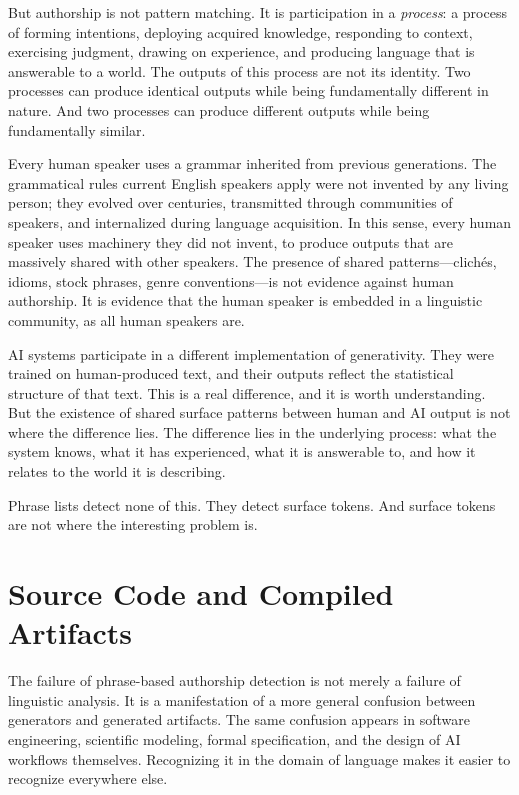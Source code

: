 \documentclass[12pt]{article}
\begin{document}
But authorship is not pattern matching. It is participation in a \emph{process}: a process of forming intentions, deploying acquired knowledge, responding to context, exercising judgment, drawing on experience, and producing language that is answerable to a world. The outputs of this process are not its identity. Two processes can produce identical outputs while being fundamentally different in nature. And two processes can produce different outputs while being fundamentally similar.

Every human speaker uses a grammar inherited from previous generations. The grammatical rules current English speakers apply were not invented by any living person; they evolved over centuries, transmitted through communities of speakers, and internalized during language acquisition. In this sense, every human speaker uses machinery they did not invent, to produce outputs that are massively shared with other speakers. The presence of shared patterns---clich\'es, idioms, stock phrases, genre conventions---is not evidence against human authorship. It is evidence that the human speaker is embedded in a linguistic community, as all human speakers are.

AI systems participate in a different implementation of generativity. They were trained on human-produced text, and their outputs reflect the statistical structure of that text. This is a real difference, and it is worth understanding. But the existence of shared surface patterns between human and AI output is not where the difference lies. The difference lies in the underlying process: what the system knows, what it has experienced, what it is answerable to, and how it relates to the world it is describing.

Phrase lists detect none of this. They detect surface tokens. And surface tokens are not where the interesting problem is.

\section{Source Code and Compiled Artifacts}

The failure of phrase-based authorship detection is not merely a failure of linguistic analysis. It is a manifestation of a more general confusion between generators and generated artifacts. The same confusion appears in software engineering, scientific modeling, formal specification, and the design of AI workflows themselves. Recognizing it in the domain of language makes it easier to recognize everywhere else.
\end{document}

